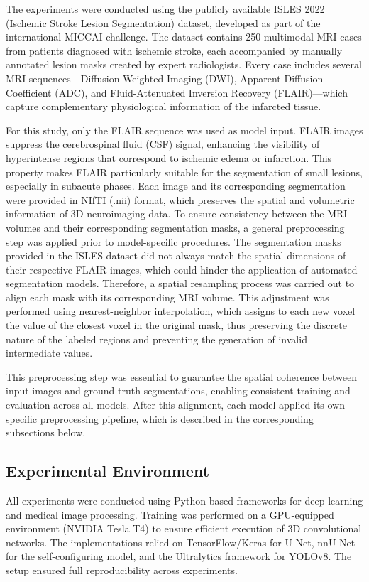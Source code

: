 \documentclass[12pt]{article}
\begin{document}
The experiments were conducted using the publicly available ISLES 2022 (Ischemic Stroke Lesion Segmentation) dataset, developed as part of the international MICCAI challenge. The dataset contains 250 multimodal MRI cases from patients diagnosed with ischemic stroke, each accompanied by manually annotated lesion masks created by expert radiologists. Every case includes several MRI sequences—Diffusion-Weighted Imaging (DWI), Apparent Diffusion Coefficient (ADC), and Fluid-Attenuated Inversion Recovery (FLAIR)—which capture complementary physiological information of the infarcted tissue.

For this study, only the FLAIR sequence was used as model input. FLAIR images suppress the cerebrospinal fluid (CSF) signal, enhancing the visibility of hyperintense regions that correspond to ischemic edema or infarction. This property makes FLAIR particularly suitable for the segmentation of small lesions, especially in subacute phases. Each image and its corresponding segmentation were provided in NIfTI (.nii) format, which preserves the spatial and volumetric information of 3D neuroimaging data. To ensure consistency between the MRI volumes and their corresponding segmentation masks, a general preprocessing step was applied prior to model-specific procedures. The segmentation masks provided in the ISLES dataset did not always match the spatial dimensions of their respective FLAIR images, which could hinder the application of automated segmentation models. Therefore, a spatial resampling process was carried out to align each mask with its corresponding MRI volume. This adjustment was performed using nearest-neighbor interpolation, which assigns to each new voxel the value of the closest voxel in the original mask, thus preserving the discrete nature of the labeled regions and preventing the generation of invalid intermediate values.

This preprocessing step was essential to guarantee the spatial coherence between input images and ground-truth segmentations, enabling consistent training and evaluation across all models. After this alignment, each model applied its own specific preprocessing pipeline, which is described in the corresponding subsections below.

\subsection{Experimental Environment} \label{subsec:environment}

All experiments were conducted using Python-based frameworks for deep learning and medical image processing. Training was performed on a GPU-equipped environment (NVIDIA Tesla T4) to ensure efficient execution of 3D convolutional networks. The implementations relied on TensorFlow/Keras for U-Net, nnU-Net for the self-configuring model, and the Ultralytics framework for YOLOv8. The setup ensured full reproducibility across experiments.
\end{document}
